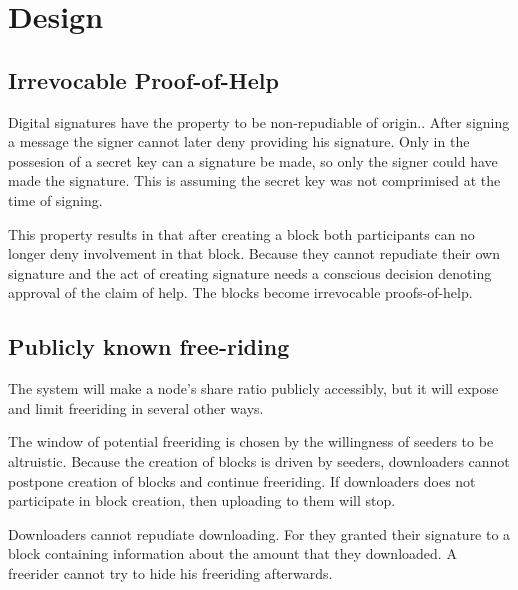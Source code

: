 \chapter{Design}

\section{Irrevocable Proof-of-Help}
Digital signatures have the property to be non-repudiable of origin.\cite{VanderLubbe-crypto}.
After signing a message the signer cannot later deny providing his signature.
Only in the possesion of a secret key can a signature be made,
so only the signer could have made the signature.
This is assuming the secret key was not comprimised at the time of signing.

This property results in that after creating a block
both participants can no longer deny involvement in that block.
Because they cannot repudiate their own signature
and the act of creating signature needs a conscious decision denoting approval of the claim of help.
The blocks become irrevocable proofs-of-help.

\section{Publicly known free-riding}
The system will make a node's share ratio publicly accessibly,
but it will expose and limit freeriding in several other ways.

The window of potential freeriding is chosen by the willingness of seeders to be altruistic.
Because the creation of blocks is driven by seeders,
downloaders cannot postpone creation of blocks and continue freeriding.
If downloaders does not participate in block creation,
then uploading to them will stop.

Downloaders cannot repudiate downloading.
For they granted their signature to a block containing information about the amount that they downloaded.
A freerider cannot try to hide his freeriding afterwards.




